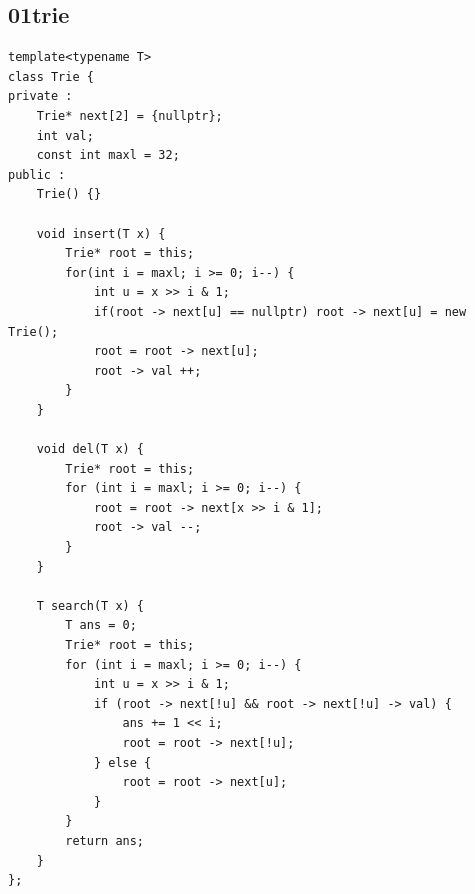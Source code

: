 \documentclass[twoside]{article}
\begin{document}
\subsection{01trie}
\begin{lstlisting}
template<typename T>
class Trie {
private :
    Trie* next[2] = {nullptr};
    int val;
    const int maxl = 32;
public : 
    Trie() {}

    void insert(T x) {
        Trie* root = this;
        for(int i = maxl; i >= 0; i--) {
            int u = x >> i & 1;
            if(root -> next[u] == nullptr) root -> next[u] = new Trie();
            root = root -> next[u];
            root -> val ++;
        }
    }

    void del(T x) {
        Trie* root = this;
        for (int i = maxl; i >= 0; i--) {
            root = root -> next[x >> i & 1];
            root -> val --;
        }
    }

    T search(T x) {
        T ans = 0;
        Trie* root = this;
        for (int i = maxl; i >= 0; i--) {
            int u = x >> i & 1;
            if (root -> next[!u] && root -> next[!u] -> val) {
                ans += 1 << i;
                root = root -> next[!u];
            } else {
                root = root -> next[u];
            }
        }
        return ans;
    }
};\end{lstlisting}
\end{document}
